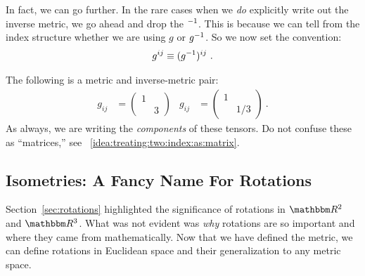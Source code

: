 \documentclass[12pt]{article}
\begin{document}
In fact, we can go further. In the rare cases when we \emph{do} explicitly write out the inverse metric, we go ahead and drop the $^{-1}$. This is because we can tell from the index structure whether we are using $g$ or $g^{-1}$. So we now set the convention:
\begin{align}
    g^{ij} \equiv (g^{-1})^{ij} \ .
\end{align}

\begin{example}
The following is a metric and inverse-metric pair:
\begin{align}
    g_{ij} &= 
    \begin{pmatrix}
        1 & \\ & 3
    \end{pmatrix}
    &
    g_{ij} &= 
    \begin{pmatrix}
        1 & \\ & 1/3
    \end{pmatrix}\ .
\end{align}
As always, we are writing the \emph{components} of these tensors. Do not confuse these as ``matrices,'' see \bigidearef~\ref{idea:treating:two:index:as:matrix}.
\end{example}



\subsection{Isometries: A Fancy Name For Rotations}\label{sec:rotations:isometries}

Section~\ref{sec:rotations} highlighted the significance of rotations in $\RR^2$ and $\RR^3$. What was not evident was \emph{why} rotations are so important and where they came from mathematically. Now that we have defined the metric, we can define rotations in Euclidean space and their generalization to any metric space.
\end{document}
